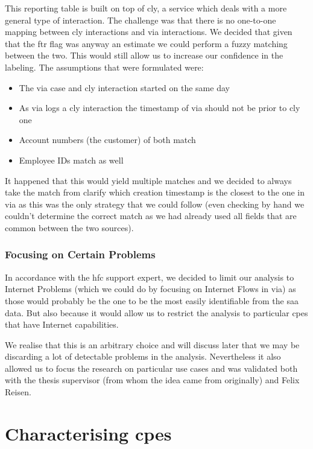 This reporting table is built on top of \acrfull{cly}, a service which deals with a more general type of interaction. The challenge was that there is no one-to-one mapping between \acrshort{cly} interactions and \acrshort{via} interactions. We decided that given that the \acrshort{ftr} flag was anyway an estimate we could perform a fuzzy matching between the two. This would still allow us to increase our confidence in the labeling. The assumptions that were formulated were:
\begin{itemize}[topsep=0pt,noitemsep]
	\item The \acrshort{via} case and \acrshort{cly} interaction started on the same day
	\item As \acrshort{via} logs a \acrshort{cly} interaction the timestamp of \acrshort{via} should not be prior to \acrshort{cly} one
	\item Account numbers (the customer) of both match
	\item Employee IDs match as well
\end{itemize}
It happened that this would yield multiple matches and we decided to always take the match from clarify which creation timestamp is the closest to the one in \acrshort{via} as this was the only strategy that we could follow (even checking by hand we couldn't determine the correct match as we had already used all fields that are common between the two sources). 

\subsubsection{Focusing on Certain Problems}
In accordance with the \acrshort{hfc} support expert, we decided to limit our analysis to Internet Problems (which we could do by focusing on Internet Flows in \acrshort{via}) as those would probably be the one to be the most easily identifiable from the \acrshort{saa} data. But also because it would allow us to restrict the analysis to particular \acrshort{cpe}s that have Internet capabilities. 

We realise that this is an arbitrary choice and will discuss later that we may be discarding a lot of detectable problems in the analysis. Nevertheless it also allowed us to focus the research on particular use cases and was validated both with the thesis supervisor (from whom the idea came from originally) and Felix Reisen. 

\section{Characterising \acrshort{cpe}s}
